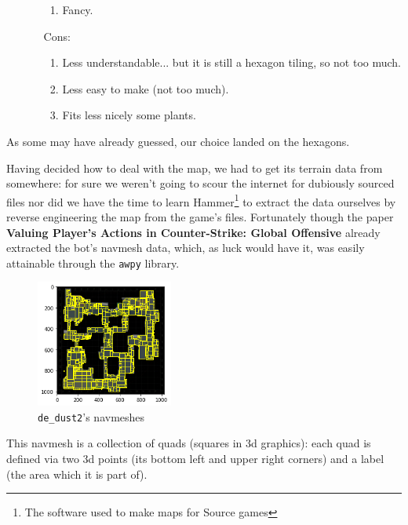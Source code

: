 \documentclass[9pt, a4paper]{IEEEtran}
\begin{document}
\begin{itemize}
\begin{itemize}
\begin{enumerate}
                \item Fancy.
            \end{enumerate}
            \item[Cons:]
            \begin{enumerate}
                \item Less understandable... but it is still a hexagon tiling, so not too much.
                \item Less easy to make (not too much).
                \item Fits less nicely some plants.
            \end{enumerate}
        \end{itemize}
    \end{itemize}

    As some may have already guessed, our choice landed on the hexagons.

    Having decided how to deal with the map, we had to get its terrain data from somewhere: for sure we weren't going to scour the internet for dubiously sourced files nor did we have the time to learn Hammer\footnote{The software used to make maps for Source games} to extract the data ourselves by reverse engineering the map from the game's files.
    Fortunately though the paper \textbf{Valuing Player's Actions in Counter-Strike: Global Offensive} already extracted the bot's navmesh data, which, as luck would have it, was easily attainable through the \texttt{awpy} library.

    \begin{figure}[h]
        \caption{\texttt{de\_dust2}'s navmeshes}
        \centering
        \includegraphics[width=0.4\textwidth]{images/navmeshes.png}
    \end{figure}

    This navmesh is a collection of quads (squares in 3d graphics): each quad is defined via two 3d points (its bottom left and upper right corners) and a label (the area which it is part of).
\end{document}
